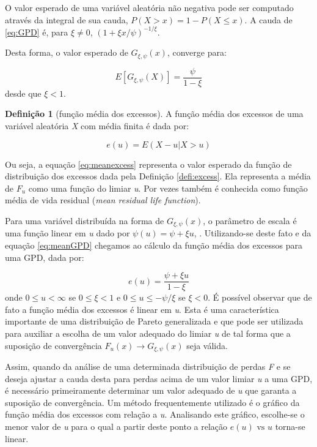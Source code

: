 \documentclass[1p]{elsarticle}
\theoremstyle{definition}
\newtheorem{defi}[teor]{Definição}
\begin{document}
O valor esperado de uma variável aleatória não negativa pode ser computado através da integral de sua cauda, $P(X>x) = 1-P(X \leq x)$. A cauda de \eqref{eq:GPD} é, para $\xi \neq 0$, $\left(1+\xi x / \psi \right)^{-1/ \xi}$.

Desta forma, o valor esperado de $G_{\xi,\psi}(x)$, converge para:

\begin{equation}
\label{eq:meanGPD}
E\left[G_{\xi,\psi} (X) \right]=\frac{\psi}{1-\xi}
\end{equation}
desde que $\xi<1$.

\begin{defi}[função média dos excessos]
	\label{defi:meanexcess}
	A função média dos excessos de uma variável aleatória \emph{X} com média finita é dada por:

	\begin{equation}
	\label{eq:meanexcess}
	e(u)=E\left(X-u | X > u\right)
	\end{equation}
\end{defi}

Ou seja, a equação \eqref{eq:meanexcess} representa o valor esperado da função de distribuição dos excessos dada pela Definição \ref{defi:excess}. Ela representa a média de $F_u$ como uma função do limiar \emph{u}. Por vezes também é conhecida como função média de vida residual (\emph{mean residual life function}).

Para uma variável distribuída na forma de $G_{\xi,\psi}(x)$, o parâmetro de escala é uma função linear em \emph{u} dado por $\psi(u)=\psi + \xi u$, \cite[Teorema 3.4.13(e)]{Embrechts1997}. Utilizando-se deste fato e da equação \eqref{eq:meanGPD} chegamos ao cálculo da função média dos excessos para uma GPD, dada por:

\begin{equation}
\label{eq:eu}
e(u)=\frac{\psi+\xi u}{1-\xi}
\end{equation}
onde $0 \leq u < \infty$ se $0 \leq \xi <1$ e $0 \leq u \leq -\psi / \xi$ se $\xi < 0$. É possível observar que de fato a função média dos excessos é linear em \emph{u}. Esta é uma característica importante de uma distribuição de Pareto generalizada e que pode ser utilizada para auxiliar a escolha de um valor adequado do limiar \emph{u} de tal forma que a suposição de convergência $F_u(x) \rightarrow G_{\xi, \psi}(x)$ seja válida.

Assim, quando da análise de uma determinada distribuição de perdas \emph{F} e se deseja ajustar a cauda desta para perdas acima de um valor limiar \emph{u} a uma GPD, é necessário primeiramente determinar um valor adequado de \emph{u} que garanta a suposição de convergência. Um método frequentemente utilizado é o gráfico da função média dos excessos com relação a \emph{u}. Analisando este gráfico, escolhe-se o menor valor de \emph{u} para o qual a partir deste ponto a relação $e(u) \text{ vs } u$ torna-se linear.
\end{document}
